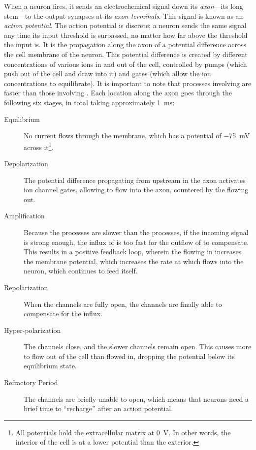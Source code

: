 When a neuron fires, it sends an electrochemical signal down its \textit{axon}---its long stem---to the output synapses at its \textit{axon terminals}.
This signal is known as an \textit{action potential}.
The action potential is discrete; a neuron sends the same signal any time its input threshold is surpassed, no matter how far above the threshold the input is.
It is the propagation along the axon of a potential difference across the cell membrane of the neuron.
This potential difference is created by different concentrations of various ions in and out of the cell, controlled by pumps (which push  out of the cell and draw  into it) and gates (which allow the ion concentrations to equilibrate).
It is important to note that processes involving  are faster than those involving .
Each location along the axon goes through the following six stages, in total taking approximately \SI{1}{\ms}:
\begin{description}
\item[Equilibrium] No current flows through the membrane, which has a potential of \SI{-75}{\mV} across it\footnote{All potentials hold the extracellular matrix at \SI{0}{\V}.  In other words, the interior of the cell is at a lower potential than the exterior.}.

\item[Depolarization] The potential difference propagating from upstream in the axon activates ion channel gates, allowing  to flow into the axon, countered by the  flowing out.

\item[Amplification] Because the  processes are slower than the  processes, if the incoming signal is strong enough, the influx of  is too fast for the outflow of  to compensate.
  This results in a positive feedback loop, wherein the  flowing in increases the membrane potential, which increases the rate at which  flows into the neuron, which continues to feed itself.

\item[Repolarization] When the  channels are fully open, the  channels are finally able to compensate for the influx.

\item[Hyper-polarization] The  channels close, and the slower  channels remain open.
  This causes more  to flow out of the cell than  flowed in, dropping the potential below its equilibrium state.

\item[Refractory Period] The  channels are briefly unable to open, which means that neurons need a brief time to ``recharge'' after an action potential.

\end{description}

